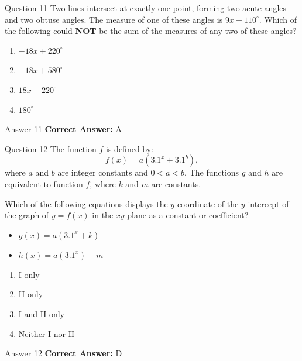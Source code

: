 \documentclass{beamer}
\begin{document}
\begin{frame}{Question 11}
\small
Two lines intersect at exactly one point, forming two acute angles and two obtuse angles.
The measure of one of these angles is \(9x - 110^\circ\).
Which of the following could \textbf{NOT} be the sum of the measures of any two of these angles?
\vspace{0.35cm}
\begin{enumerate}
    \item[A.] \(-18x + 220^\circ\)
    \item[B.] \(-18x + 580^\circ\)
    \item[C.] \(18x - 220^\circ\)
    \item[D.] \(180^\circ\)
\end{enumerate}
\end{frame}
\begin{frame}{Answer 11}
\small
\textbf{Correct Answer:} A
\end{frame}

\begin{frame}{Question 12}
\small
The function \(f\) is defined by:
\[
f(x) = a(3.1^x + 3.1^b),
\]
where \(a\) and \(b\) are integer constants and \(0 < a < b\).
The functions \(g\) and \(h\) are equivalent to function \(f\), where \(k\) and \(m\) are constants.

Which of the following equations displays the \(y\)-coordinate of the \(y\)-intercept of the graph
of \(y = f(x)\) in the \(xy\)-plane as a constant or coefficient?

\begin{itemize}
\item[I.] \(g(x) = a(3.1^x + k)\)
\item[II.] \(h(x) = a(3.1^x) + m\)
\end{itemize}
\vspace{0.35cm}
\begin{enumerate}
    \item[A.] I only
    \item[B.] II only
    \item[C.] I and II only
    \item[D.] Neither I nor II
\end{enumerate}
\end{frame}
\begin{frame}{Answer 12}
\small
\textbf{Correct Answer:} D
\end{frame}
\end{document}
